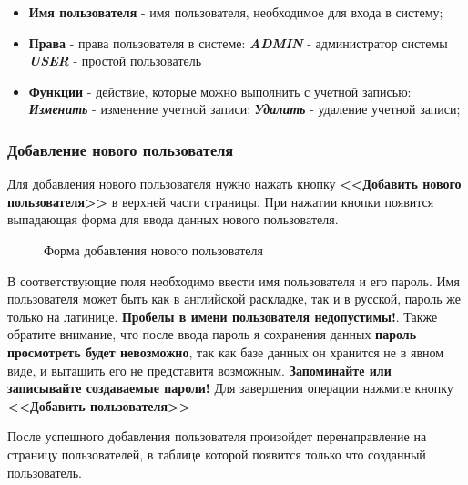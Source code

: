 \documentclass[a4paper]{article}
\begin{document}
\begin{itemize}
\setlength{\itemsep}{-2mm}
	\item \textbf{Имя пользователя} - имя пользователя, необходимое для входа в систему;
	\item \textbf{Права} - права пользователя в системе:
		\subitem \textbf{\textit{ADMIN}} -  администратор системы
		\subitem \textbf{\textit{USER}} - простой пользователь
	\item \textbf{Функции} -  действие, которые можно выполнить с учетной записью:
		\subitem \textbf{\textit{Изменить}} - изменение учетной записи;
		\subitem \textbf{\textit{Удалить}} - удаление учетной записи;
\end{itemize}

\subsubsection{Добавление нового пользователя}

Для добавления нового пользователя нужно нажать кнопку \textbf{<<Добавить нового пользователя>>} в верхней части страницы. При нажатии кнопки появится выпадающая форма для ввода данных нового пользователя.

\begin{figure}[h]
\caption{Форма добавления нового пользователя}
\label{fig:image9}
\end{figure}

В соответствующие поля необходимо ввести имя пользователя и его пароль. Имя пользователя может быть как в английской раскладке, так и в русской, пароль же только на латинице. \textbf{Пробелы в имени пользователя недопустимы!}. Также обратите внимание, что после ввода пароль я сохранения данных \textbf{пароль просмотреть будет невозможно}, так как базе данных он хранится не в явном виде, и вытащить его не представитя возможным. \textbf{Запоминайте или записывайте создаваемые пароли!} Для завершения операции нажмите кнопку \textbf{<<Добавить пользователя>>}

После успешного добавления пользователя произойдет перенаправление на страницу пользователей, в таблице которой появится только что созданный пользователь.
\end{document}

